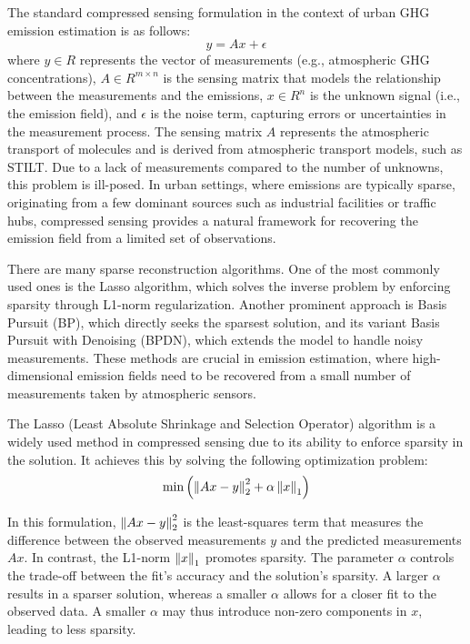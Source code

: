 The standard compressed sensing formulation in the context of urban GHG emission estimation is as follows:
\begin{equation}
    y = A x + \epsilon
\end{equation}
where $y \in R$ represents the vector of measurements (e.g., atmospheric GHG concentrations), $A \in R^{m \times n}$ is the sensing matrix that models the relationship between the measurements and the emissions, $x \in R^n$ is the unknown signal (i.e., the emission field), and $\epsilon$ is the noise term, capturing errors or uncertainties in the measurement process.
The sensing matrix $A$ represents the atmospheric transport of molecules and is derived from atmospheric transport models, such as STILT.
Due to a lack of measurements compared to the number of unknowns, this problem is ill-posed.
In urban settings, where emissions are typically sparse, originating from a few dominant sources such as industrial facilities or traffic hubs, compressed sensing provides a natural framework for recovering the emission field from a limited set of observations.

There are many sparse reconstruction algorithms.
One of the most commonly used ones is the Lasso algorithm, which solves the inverse problem by enforcing sparsity through L1-norm regularization.
Another prominent approach is Basis Pursuit (BP), which directly seeks the sparsest solution, and its variant Basis Pursuit with Denoising (BPDN),  which extends the model to handle noisy measurements.
These methods are crucial in emission estimation, where high-dimensional emission fields need to be recovered from a small number of measurements taken by atmospheric sensors.

The Lasso (Least Absolute Shrinkage and Selection Operator) algorithm is a widely used method in compressed sensing due to its ability to enforce sparsity in the solution.
It achieves this by solving the following optimization problem:
\begin{equation}
    \min{\left( \left\lVert Ax -y \right\rVert_2^2 + \alpha\left\lVert x\right\rVert_1 \right)}
\end{equation}

In this formulation, $\left\lVert Ax -y \right\rVert_2^2$ is the least-squares term that measures the difference between the observed measurements $y$ and the predicted measurements $Ax$.
In contrast, the L1-norm $\left\lVert x\right\rVert_1$ promotes sparsity.
The parameter $\alpha$ controls the trade-off between the fit's accuracy and the solution's sparsity.
A larger $\alpha$ results in a sparser solution, whereas a smaller $\alpha$ allows for a closer fit to the observed data.
A smaller $\alpha$ may thus introduce non-zero components in $x$, leading to less sparsity.

